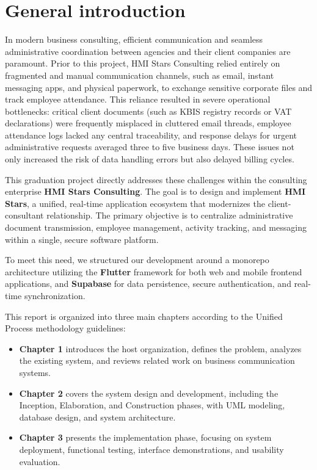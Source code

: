 \chapter*{General introduction}
In modern business consulting, efficient communication and seamless administrative coordination between agencies and their client companies are paramount. Prior to this project, HMI Stars Consulting relied entirely on fragmented and manual communication channels, such as email, instant messaging apps, and physical paperwork, to exchange sensitive corporate files and track employee attendance. This reliance resulted in severe operational bottlenecks: critical client documents (such as KBIS registry records or VAT declarations) were frequently misplaced in cluttered email threads, employee attendance logs lacked any central traceability, and response delays for urgent administrative requests averaged three to five business days. These issues not only increased the risk of data handling errors but also delayed billing cycles.

This graduation project directly addresses these challenges within the consulting enterprise \textbf{HMI Stars Consulting}. The goal is to design and implement \textbf{HMI Stars}, a unified, real-time application ecosystem that modernizes the client-consultant relationship. The primary objective is to centralize administrative document transmission, employee management, activity tracking, and messaging within a single, secure software platform.


To meet this need, we structured our development around a monorepo architecture utilizing the \textbf{Flutter} framework for both web and mobile frontend applications, and \textbf{Supabase} for data persistence, secure authentication, and real-time synchronization.

This report is organized into three main chapters according to the Unified Process methodology guidelines:
\begin{itemize}
\item \textbf{Chapter 1} introduces the host organization, defines the problem, analyzes the existing system, and reviews related work on business communication systems.

\item \textbf{Chapter 2} covers the system design and development, including the Inception, Elaboration, and Construction phases, with UML modeling, database design, and system architecture.

\item \textbf{Chapter 3} presents the implementation phase, focusing on system deployment, functional testing, interface demonstrations, and usability evaluation.

\end{itemize}
